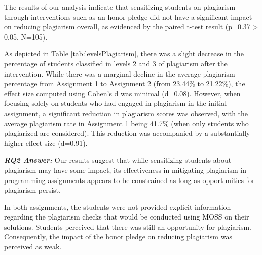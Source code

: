 The results of our analysis indicate that sensitizing students on plagiarism through interventions such as an honor pledge did not have a significant impact on reducing plagiarism overall, as evidenced by the paired t-test result (p=0.37 > 0.05, N=105). 

As depicted in Table \ref{tab:levelsPlagiarism}, there was a slight decrease in the percentage of students classified in levels 2 and 3 of plagiarism after the intervention. While there was a marginal decline in the average plagiarism percentage from Assignment 1 to Assignment 2 (from 23.44\% to 21.22\%), the effect size computed using Cohen's d was minimal (d=0.08). However, when focusing solely on students who had engaged in plagiarism in the initial assignment, a significant reduction in plagiarism scores was observed, with the average plagiarism rate in Assignment 1 being 41.7\% (when only students who plagiarized are considered). This reduction was accompanied by a substantially higher effect size (d=0.91).

\vspace{4pt}
\begin{mdframed}
\textbf{\textit{RQ2 Answer:}} Our results suggest that while sensitizing students about plagiarism may have some impact, its effectiveness in mitigating plagiarism in programming assignments appears to be constrained as long as opportunities for plagiarism persist.
\end{mdframed}
\vspace{4pt}

In both assignments, the students were not provided explicit information regarding the plagiarism checks that would be conducted using MOSS on their solutions. Students perceived that there was still an opportunity for plagiarism. Consequently, the impact of the honor pledge on reducing plagiarism was perceived as weak.
